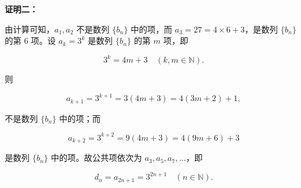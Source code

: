 \begin{answer}
\textbf{证明二：}

由计算可知，$a_1,a_2$ 不是数列 $\{b_n\}$ 中的项，而 $a_3=27=4\times6+3$，是数列 $\{b_n\}$ 的第 6 项。设 $a_k=3^k$ 是数列 $\{b_n\}$ 的第 $m$ 项，即

\nopagebreak[4]
\[
3^k=4m+3\quad(k,m\in\mathbb N).
\]

则

\nopagebreak[4]
\[
a_{k+1}=3^{k+1}=3(4m+3)=4(3m+2)+1,
\]

不是数列 $\{b_n\}$ 中的项；而

\nopagebreak[4]
\[
a_{k+2}=3^{k+2}=9(4m+3)=4(9m+6)+3
\]

是数列 $\{b_n\}$ 中的项。故公共项依次为 $a_3,a_5,a_7,\ldots$，即

\nopagebreak[4]
\[
d_n=a_{2n+1}=3^{2n+1}\quad(n\in\mathbb N).
\]



\end{answer}